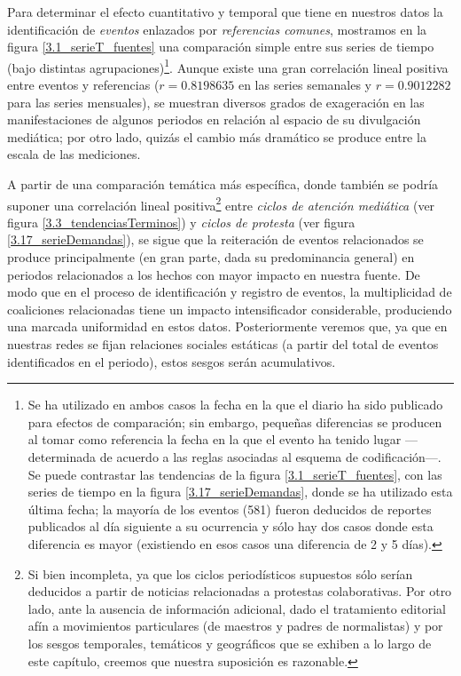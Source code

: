 \documentclass[letterpaper, 11pt]{book}
\theoremstyle{definition}
\theoremstyle{remark}
\begin{document}
Para determinar el efecto cuantitativo y temporal que tiene en nuestros datos la identificación de \emph{eventos} enlazados por \emph{referencias comunes}, mostramos en la figura \ref{3.1_serieT_fuentes} una comparación simple entre sus series de tiempo  (bajo distintas agrupaciones)\footnote{
    Se ha utilizado en ambos casos la fecha en la que el diario ha sido publicado para efectos de comparación; sin embargo, pequeñas diferencias se producen al tomar como referencia la fecha en la que el evento ha tenido lugar ---determinada de acuerdo a las reglas asociadas al esquema de codificación---.
    Se puede contrastar las tendencias de la figura \ref{3.1_serieT_fuentes}, con las series de tiempo en la figura \ref{3.17_serieDemandas}, donde se ha utilizado esta última fecha; la mayoría de los eventos (581) fueron deducidos de reportes publicados al día siguiente a su ocurrencia y sólo hay dos casos donde esta diferencia es mayor (existiendo en esos casos una diferencia de 2 y 5 días).
}. 
Aunque existe una gran correlación lineal positiva entre eventos y referencias ($r= 0.8198635$ en las series semanales y $r= 0.9012282$ para las series mensuales), se muestran diversos grados de exageración en las manifestaciones de algunos periodos en relación al espacio de su divulgación mediática; por otro lado, quizás el cambio más dramático se produce entre la escala de las mediciones. 


A partir de una comparación temática más específica, donde también se podría suponer una correlación lineal positiva\footnote{
    Si bien incompleta, ya que los ciclos periodísticos supuestos sólo serían deducidos a partir de noticias relacionadas a protestas colaborativas. 
    Por otro lado, ante la ausencia de información adicional, dado el tratamiento editorial afín a movimientos particulares (de maestros y padres de normalistas) y por los sesgos temporales, temáticos y geográficos que se exhiben a lo largo de este capítulo, creemos que nuestra suposición es razonable. 
} 
entre \emph{ciclos de atención mediática} (ver figura \ref{3.3_tendenciasTerminos}) y \emph{ciclos de protesta} (ver figura \ref{3.17_serieDemandas}), se sigue que la reiteración de eventos relacionados se produce principalmente (en gran parte, dada su predominancia general) en periodos relacionados a los hechos con mayor impacto en nuestra fuente. 
De modo que en el proceso de identificación y registro de eventos, la multiplicidad de coaliciones relacionadas tiene un impacto intensificador considerable, produciendo una marcada uniformidad en estos datos. 
Posteriormente veremos que, ya que en nuestras redes se fijan relaciones sociales estáticas (a partir del total de eventos identificados en el periodo), estos sesgos serán acumulativos. 
\end{document}
